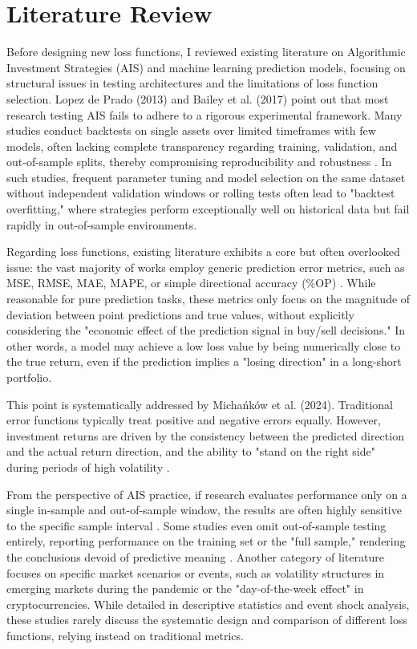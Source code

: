 \documentclass[openany]{book}
\numberwithin{figure}{chapter}
\numberwithin{equation}{chapter}
\begin{document}
\chapter{Literature Review}

Before designing new loss functions, I reviewed existing literature on Algorithmic Investment Strategies (AIS) and machine learning prediction models, focusing on structural issues in testing architectures and the limitations of loss function selection. Lopez de Prado (2013) and Bailey et al. (2017) point out that most research testing AIS fails to adhere to a rigorous experimental framework. Many studies conduct backtests on single assets over limited timeframes with few models, often lacking complete transparency regarding training, validation, and out-of-sample splits, thereby compromising reproducibility and robustness \cite{lopez2013look, bailey2017probability}. In such studies, frequent parameter tuning and model selection on the same dataset without independent validation windows or rolling tests often lead to "backtest overfitting," where strategies perform exceptionally well on historical data but fail rapidly in out-of-sample environments.

Regarding loss functions, existing literature exhibits a core but often overlooked issue: the vast majority of works employ generic prediction error metrics, such as MSE, RMSE, MAE, MAPE, or simple directional accuracy (\%OP) \cite{di2016artificial, yang2019deep}. While reasonable for pure prediction tasks, these metrics only focus on the magnitude of deviation between point predictions and true values, without explicitly considering the "economic effect of the prediction signal in buy/sell decisions." In other words, a model may achieve a low loss value by being numerically close to the true return, even if the prediction implies a "losing direction" in a long-short portfolio.

This point is systematically addressed by Michańków et al. (2024). Traditional error functions typically treat positive and negative errors equally. However, investment returns are driven by the consistency between the predicted direction and the actual return direction, and the ability to "stand on the right side" during periods of high volatility \cite{michankow2024mean}.

From the perspective of AIS practice, if research evaluates performance only on a single in-sample and out-of-sample window, the results are often highly sensitive to the specific sample interval \cite{wiecki2016all}. Some studies even omit out-of-sample testing entirely, reporting performance on the training set or the "full sample," rendering the conclusions devoid of predictive meaning \cite{topcu2020impact}. Another category of literature focuses on specific market scenarios or events, such as volatility structures in emerging markets during the pandemic or the "day-of-the-week effect" in cryptocurrencies. While detailed in descriptive statistics and event shock analysis, these studies rarely discuss the systematic design and comparison of different loss functions, relying instead on traditional metrics.
\end{document}

